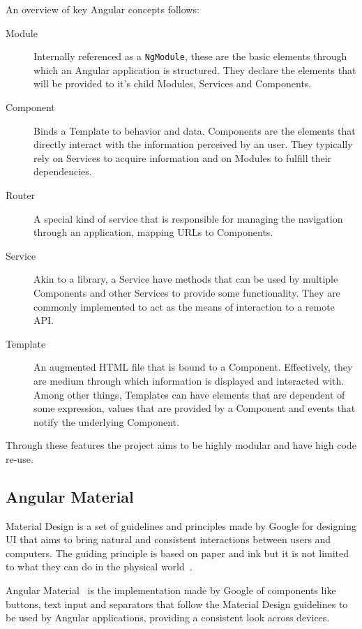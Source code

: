 An overview of key Angular concepts follows:
\begin{description}
\item[Module] Internally referenced as a \texttt{NgModule}, these are the basic elements through which an Angular application is structured\cite{angularmodule}. They declare the elements that will be provided to it's child Modules, Services and Components.
\item[Component] Binds a Template to behavior and data. Components are the elements that directly interact with the information perceived by an user. They typically rely on Services to acquire information and on Modules to fulfill their dependencies. 
\item[Router] A special kind of service that is responsible for managing the navigation through an application, mapping \gls{URL}s to Components.
\item[Service] Akin to a library, a Service have methods that can be used by multiple Components and other Services to provide some functionality. They are commonly implemented to act as the means of interaction to a remote \gls{API}.
\item[Template] An augmented \gls{HTML} file that is bound to a Component. Effectively, they are medium through which information is displayed and interacted with. Among other things, Templates can have elements that are dependent of some expression, values that are provided by a Component and events that notify the underlying Component.
\end{description}

Through these features the project aims to be highly modular and have high code re-use.

\subsection{Angular Material}
Material Design is a set of guidelines and principles made by Google for designing \gls{UI} that aims to bring natural and consistent interactions between users and computers. The guiding principle is based on paper and ink but it is not limited to what they can do in the physical world~\cite{materialdesign}.

Angular Material~\cite{angularmaterial} is the implementation made by Google of components like buttons, text input and separators that follow the Material Design guidelines to be used by Angular applications, providing a consistent look across devices.

